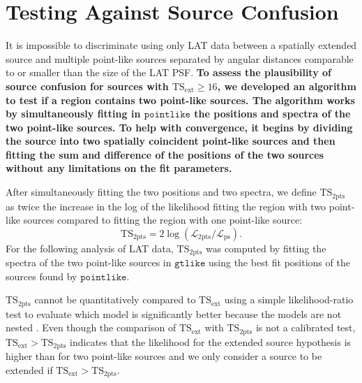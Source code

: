 \documentclass[12pt,preprint]{aastex}
\newcommand{\tsext}{{\ensuremath{\text{TS}_{\text{ext}}}}\xspace}
\newcommand{\tsinc}{\ensuremath{\text{TS}_{\text{2pts}}}\xspace}
\newcommand{\likelihood}{\ensuremath{\mathcal{L}}\xspace}
\newcommand{\gtlike}{\ensuremath{\mathtt{gtlike}}\xspace}
\newcommand{\pointlike}{\ensuremath{\mathtt{pointlike}}\xspace}
\newcommand{\newtext}[1]{{\bfseries \color{red}#1}}
\begin{document}
\section{Testing Against Source Confusion}
\label{dual_localization_method}

It is impossible to discriminate using only LAT data between a
spatially extended source and multiple point-like sources separated by
angular distances comparable to or smaller than the size of the LAT PSF. 
\newtext{ To assess the plausibility of source confusion for sources with
$\tsext\ge16$, we developed an algorithm to test if a region contains
two point-like sources.  The algorithm works by simultaneously fitting
in \pointlike the positions and spectra of the two point-like sources.
To help with convergence, it begins by dividing the source into two
spatially coincident point-like sources and then fitting the sum and
difference of the positions of the two sources without any limitations
on the fit parameters.}

After simultaneously fitting the two positions and two spectra,
we define \tsinc as twice the increase in the log of the likelihood
fitting the region with two point-like sources compared to fitting the
region with one point-like source:
\begin{equation}
  \tsinc=2\log(\likelihood_\text{2pts}/\likelihood_\text{ps}).
\end{equation} 
For the following analysis of LAT data, \tsinc was computed
by fitting the spectra of the two point-like sources in \gtlike using the best fit positions
of the sources found by \pointlike.

\tsinc cannot be quantitatively compared to \tsext using a simple
likelihood-ratio test to evaluate which model is significantly better
because the models are not nested \citep{statistics_with_care}.
Even though the comparison of \tsext with \tsinc is not a calibrated
test, $\tsext>\tsinc$ indicates that the likelihood for the extended
source hypothesis is higher than for two point-like sources and we only
consider a source to be extended if $\tsext>\tsinc$.
\end{document}
